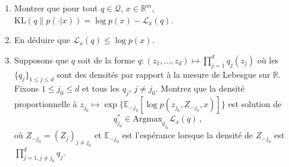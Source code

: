 \documentclass[a4paper,10pt,fleqn]{article}
\newcommand{\eqsp}{\,}
\newcommand{\rset}{\ensuremath{\mathbb{R}}}
\newcommand{\1}{\ensuremath{\mathbbm{1}}}
\begin{document}
\begin{enumerate}
\item Montrer que pour tout $q\in\mathcal{Q}$, $x\in\rset^m$, $\mathrm{KL}(q\|p(\cdot|x)) = \log p(x) - \mathcal{L}_x(q) $.

%
\item En d\'eduire que $\mathcal{L}_x(q) \leq \log p(x)$.
%
%
\item Supposons que $q$ soit de la forme $q:(z_1,\ldots,z_d)\mapsto \prod_{j=1}^dq_j(z_j)$ o\`u les $\{q_j\}_{1\leq j\leq d}$ sont des densit\'es par rapport \`a la mesure de Lebesgue sur $\rset$. Fixons $1\leq j_0 \leq d$ et tous les $q_j$, $j\neq j_0$. Montrez que la densit\'e proportionnelle \`a $z_{j_0} \mapsto \exp\{\mathbb{E}_{-j_0}[\log p (z_{j_0},Z_{-j_0},x)]\}$ est solution de 
$$
q_{j_0}^* \in \mathrm{Argmax}_{q_{j_0}} \mathcal{L}_x(q)\eqsp,
$$
o\`u $Z_{-j_0} = (Z_j)_{j\neq j_0}$ et $\mathbb{E}_{-j_0}$ est l'esp\'erance lorsque la densit\'e de $Z_{-j_0}$ est $\prod_{j=1,j\neq j_0}^dq_j$.
%
%


\end{enumerate}
\end{document}
